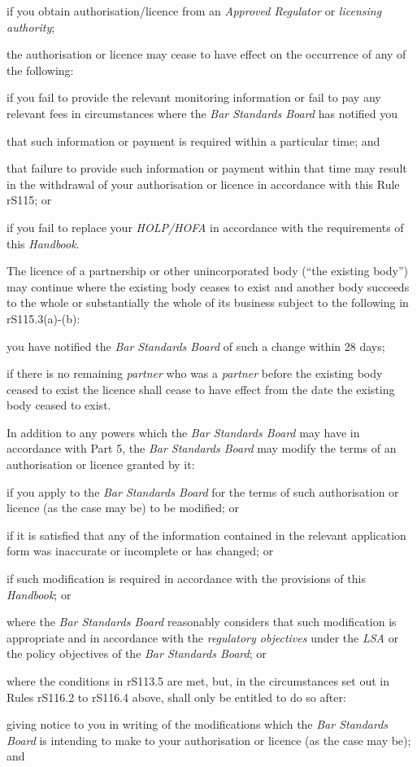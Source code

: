 \item if you obtain authorisation/licence from an \emph{Approved
Regulator} or \emph{licensing authority};\la
\item the authorisation or licence may cease to have effect on the
occurrence of any of the following:
\al
\item if you fail to provide the relevant monitoring information or fail
to pay any relevant fees in circumstances where the \emph{Bar Standards
Board} has notified you \rl
\item  that such information or payment is required
within a particular time; and \item that failure to provide such
information or payment within that time may result in the withdrawal of
your authorisation or licence in accordance with this Rule rS115; or\lr

\item if you fail to replace your \emph{HOLP/HOFA} in accordance with the
requirements of this \emph{Handbook}.\la
\item The licence of a partnership or other unincorporated body (``the
existing body'') may continue where the existing body ceases to exist
and another body succeeds to the whole or substantially the whole of its
business subject to the following in rS115.3(a)-(b):
\al
\item you have notified the \emph{Bar Standards Board} of such a change
within 28 days;

\item if there is no remaining \emph{partner} who was a \emph{partner}
before the existing body ceased to exist the licence shall cease to have
effect from the date the existing body ceased to exist.\la
\ln
{}



In addition to any powers which the \emph{Bar Standards Board} may have
in accordance with Part 5, the \emph{Bar Standards Board} may modify the
terms of an authorisation or licence granted by it:\nl\item if you apply to the \emph{Bar Standards Board} for the terms of such
authorisation or licence (as the case may be) to be modified; or
\item if it is satisfied that any of the information contained in the
relevant application form was inaccurate or incomplete or has changed;
or
\item if such modification is required in accordance with the provisions of
this \emph{Handbook}; or
\item where the \emph{Bar Standards Board} reasonably considers that such
modification is appropriate and in accordance with the \emph{regulatory
objectives} under the \emph{LSA} or the policy objectives of the
\emph{Bar Standards Board}; or
\item where the conditions in rS113.5 are met, but, in the circumstances set out in Rules rS116.2 to rS116.4 above,
shall only be entitled to do so after:
\al
\item giving notice to you in writing of the modifications which the
\emph{Bar Standards Board} is intending to make to your authorisation or
licence (as the case may be); and

